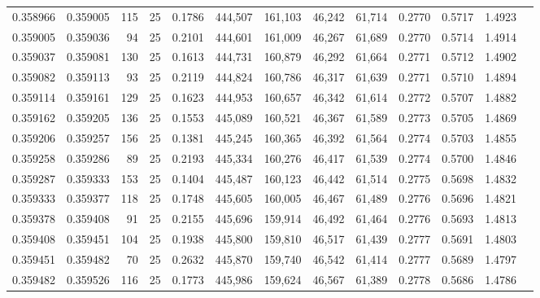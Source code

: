 \begin{tabular}{rrrrrrrrrrrrr}
0.358966 & 0.359005 &   115 &  25 &                                     0.1786 & 444,507 & 161,103 &  46,242 &  61,714 & 0.2770 & 0.5717 & 1.4923 \\
0.359005 & 0.359036 &    94 &  25 &                                     0.2101 & 444,601 & 161,009 &  46,267 &  61,689 & 0.2770 & 0.5714 & 1.4914 \\
0.359037 & 0.359081 &   130 &  25 &                                     0.1613 & 444,731 & 160,879 &  46,292 &  61,664 & 0.2771 & 0.5712 & 1.4902 \\
0.359082 & 0.359113 &    93 &  25 &                                     0.2119 & 444,824 & 160,786 &  46,317 &  61,639 & 0.2771 & 0.5710 & 1.4894 \\
0.359114 & 0.359161 &   129 &  25 &                                     0.1623 & 444,953 & 160,657 &  46,342 &  61,614 & 0.2772 & 0.5707 & 1.4882 \\
0.359162 & 0.359205 &   136 &  25 &                                     0.1553 & 445,089 & 160,521 &  46,367 &  61,589 & 0.2773 & 0.5705 & 1.4869 \\
0.359206 & 0.359257 &   156 &  25 &                                     0.1381 & 445,245 & 160,365 &  46,392 &  61,564 & 0.2774 & 0.5703 & 1.4855 \\
0.359258 & 0.359286 &    89 &  25 &                                     0.2193 & 445,334 & 160,276 &  46,417 &  61,539 & 0.2774 & 0.5700 & 1.4846 \\
0.359287 & 0.359333 &   153 &  25 &                                     0.1404 & 445,487 & 160,123 &  46,442 &  61,514 & 0.2775 & 0.5698 & 1.4832 \\
0.359333 & 0.359377 &   118 &  25 &                                     0.1748 & 445,605 & 160,005 &  46,467 &  61,489 & 0.2776 & 0.5696 & 1.4821 \\
0.359378 & 0.359408 &    91 &  25 &                                     0.2155 & 445,696 & 159,914 &  46,492 &  61,464 & 0.2776 & 0.5693 & 1.4813 \\
0.359408 & 0.359451 &   104 &  25 &                                     0.1938 & 445,800 & 159,810 &  46,517 &  61,439 & 0.2777 & 0.5691 & 1.4803 \\
0.359451 & 0.359482 &    70 &  25 &                                     0.2632 & 445,870 & 159,740 &  46,542 &  61,414 & 0.2777 & 0.5689 & 1.4797 \\
0.359482 & 0.359526 &   116 &  25 &                                     0.1773 & 445,986 & 159,624 &  46,567 &  61,389 & 0.2778 & 0.5686 & 1.4786 \\

\end{tabular}
